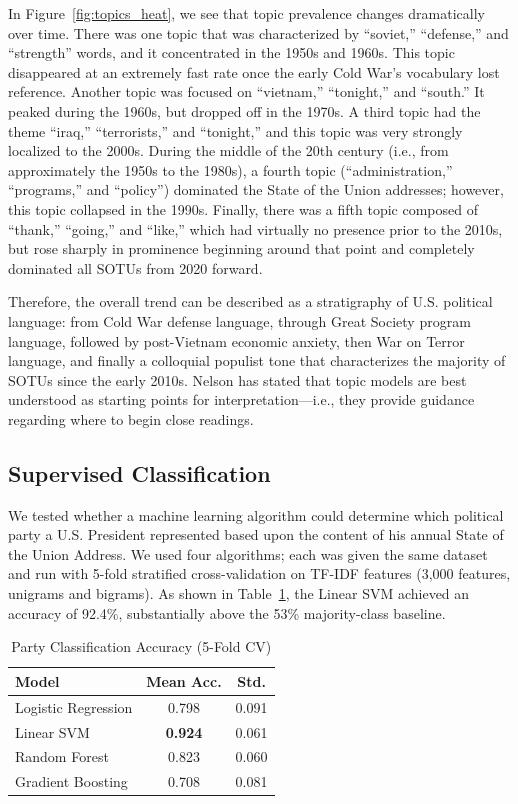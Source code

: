 \documentclass[11pt,twocolumn]{article}
\begin{document}
In Figure~\ref{fig:topics_heat}, we see that topic prevalence changes dramatically over time. There was one topic that was characterized by ``soviet,'' ``defense,'' and ``strength'' words, and it concentrated in the 1950s and 1960s. This topic disappeared at an extremely fast rate once the early Cold War's vocabulary lost reference. Another topic was focused on ``vietnam,'' ``tonight,'' and ``south.'' It peaked during the 1960s, but dropped off in the 1970s. A third topic had the theme ``iraq,'' ``terrorists,'' and ``tonight,'' and this topic was very strongly localized to the 2000s. During the middle of the 20th century (i.e., from approximately the 1950s to the 1980s), a fourth topic (``administration,'' ``programs,'' and ``policy'') dominated the State of the Union addresses; however, this topic collapsed in the 1990s. Finally, there was a fifth topic composed of ``thank,'' ``going,'' and ``like,'' which had virtually no presence prior to the 2010s, but rose sharply in prominence beginning around that point and completely dominated all SOTUs from 2020 forward.

Therefore, the overall trend can be described as a stratigraphy of U.S. political language: from Cold War defense language, through Great Society program language, followed by post-Vietnam economic anxiety, then War on Terror language, and finally a colloquial populist tone that characterizes the majority of SOTUs since the early 2010s. Nelson \citeyearpar{nelson2010} has stated that topic models are best understood as starting points for interpretation---i.e., they provide guidance regarding where to begin close readings.

\subsection{Supervised Classification}

We tested whether a machine learning algorithm could determine which political party a U.S. President represented based upon the content of his annual State of the Union Address. We used four algorithms; each was given the same dataset and run with 5-fold stratified cross-validation on TF-IDF features (3,000 features, unigrams and bigrams). As shown in Table~\ref{tab:classification}, the Linear SVM achieved an accuracy of 92.4\%, substantially above the 53\% majority-class baseline.

\begin{table}[h]
\centering
\small
\caption{Party Classification Accuracy (5-Fold CV)}
\label{tab:classification}
\begin{tabular}{lcc}
\toprule
\textbf{Model} & \textbf{Mean Acc.} & \textbf{Std.} \\
\midrule
Logistic Regression & 0.798 & 0.091 \\
Linear SVM & \textbf{0.924} & 0.061 \\
Random Forest & 0.823 & 0.060 \\
Gradient Boosting & 0.708 & 0.081 \\
\bottomrule
\end{tabular}
\end{table}
\end{document}

